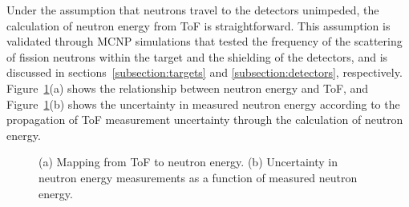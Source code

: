 Under the assumption that neutrons travel to the detectors unimpeded, the calculation of neutron energy from ToF is straightforward.
This assumption is validated through MCNP simulations that tested the frequency of the scattering of fission neutrons within the target and the shielding of the detectors, and is discussed in sections~\ref{subsection:targets} and \ref{subsection:detectors}, respectively.
Figure~\ref{fig:ErgUncertainty}(a) shows the relationship between neutron energy and ToF, and Figure~\ref{fig:ErgUncertainty}(b) shows the uncertainty in measured neutron energy according to the propagation of ToF measurement uncertainty through the calculation of neutron energy.
\begin{figure}[]
    \caption{(a) Mapping from ToF to neutron energy.
    (b) Uncertainty in neutron energy measurements as a function of measured neutron energy.}
    \label{fig:ErgUncertainty}
\end{figure}


